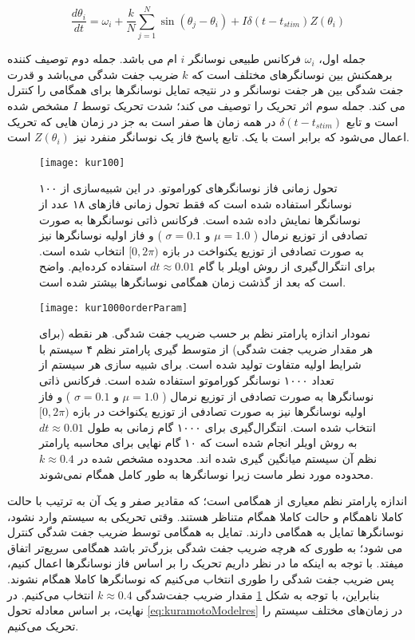 \begin{equation}
    \frac{d \theta_i}{dt} = \omega_i + \frac{k}{N} \sum_{j=1}^{N} \sin(\theta_j -\theta_i) + I \delta(t-t_{stim}) Z(\theta_i)
    \label{eq:kuramotoModelres}
\end{equation}

جمله اول، 
$\omega_i$
فرکانس طبیعی نوسانگر 
$i$ 
ام می باشد.
جمله دوم توصیف کننده برهمکنش بین نوسانگرهای مختلف است که 
$k$
ضریب جفت شدگی می‌باشد و قدرت جفت شدگی بین هر جفت نوسانگر و در نتیجه تمایل نوسانگرها برای همگامی را کنترل می کند. 
جمله سوم اثر تحریک را توصیف می کند؛ شدت تحریک توسط 
$I$
مشخص شده است و تابع 
$\delta(t-t_{stim})$
در همه زمان ها صفر است به جز در زمان هایی که تحریک اعمال می‌شود که برابر است با یک.
تابع پاسخ فاز یک نوسانگر منفرد نیز
$Z(\theta_i)$
است.

\begin{figure}
	\centering
	\texttt{[image: kur100]}
    \caption{
تحول زمانی فاز نوسانگرهای کوراموتو. در این شبیه‌سازی از ۱۰۰ نوسانگر استفاده شده است که فقط تحول زمانی فازهای ۱۸ عدد از نوسانگرها نمایش داده شده است. فرکانس ذاتی نوسانگرها به صورت تصادفی از توزیع نرمال (
$\mu=1.0$  و $\sigma=0.1$
) و فاز اولیه نوسانگرها نیز به صورت تصادفی از توزیع یکنواخت در بازه 
$[0,2\pi)$
انتخاب شده است. برای انتگرال‌گیری از روش اویلر با گام 
$dt\approx 0.01$
استفاده کرده‌ایم. واضح است که بعد از گذشت زمان همگامی نوسانگرها بیشتر شده است.
    }
\end{figure}



\begin{figure}
	\centering
	\texttt{[image: kur1000orderParam]}
    \caption{
نمودار اندازه پارامتر نظم بر حسب ضریب جفت شدگی. هر نقطه (برای هر مقدار ضریب جفت شدگی) از متوسط گیری پارامتر نظم ۴ سیستم با شرایط اولیه متفاوت تولید شده است. برای شبیه سازی هر سیستم از تعداد ۱۰۰۰ نوسانگر کوراموتو استفاده شده است. فرکانس ذاتی نوسانگرها به صورت تصادفی از توزیع نرمال (
$\mu=1.0$  و $\sigma=0.1$
) و فاز اولیه نوسانگرها نیز به صورت تصادفی از توزیع یکنواخت در بازه 
$[0,2\pi)$
انتخاب شده است. انتگرال‌گیری برای ۱۰۰۰ گام زمانی به طول
 $dt \approx 0.01$
 به روش اویلر انجام شده است که ۱۰ گام نهایی برای محاسبه پارامتر نظم آن سیستم میانگین گیری شده اند. محدوده مشخص شده در 
 $k \approx 0.4$
 محدوده مورد نطر ماست زیرا نوسانگرها به طور کامل همگام نمی‌شوند.
    }
    \label{fig:orderParam-k}
\end{figure}

اندازه پارامتر نظم معیاری از همگامی است؛ که مقادیر صفر و یک آن به ترتیب با حالت کاملا ناهمگام و حالت کاملا همگام متناظر هستند. وقتی تحریکی به سیستم وارد نشود، نوسانگرها تمایل به همگامی دارند. تمایل به همگامی توسط ضریب جفت شدگی کنترل می شود؛ به طوری که هرچه ضریب جفت شدگی بزرگ‌تر باشد همگامی سریع‌تر اتفاق میفتد. با توجه به اینکه ما در نظر داریم تحریک‌ را بر اساس فاز نوسانگرها اعمال کنیم، پس ضریب جفت شدگی را طوری انتخاب می‌کنیم که نوسانگرها کاملا همگام نشوند. بنابراین، با توجه به شکل 
\ref{fig:orderParam-k}
مقدار ضریب جفت‌شدگی 
$k \approx 0.4$
انتخاب می‌کنیم. در نهایت، بر اساس معادله تحول 
\ref{eq:kuramotoModelres}
در زمان‌های مختلف سیستم را تحریک می‌کنیم.

